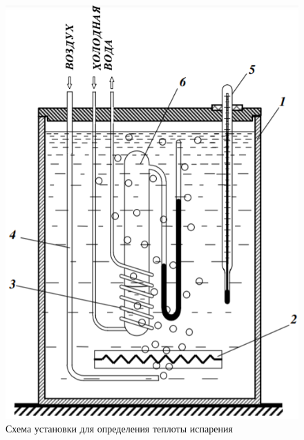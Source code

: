 \documentclass[a4paper,12pt]{article} %
\begin{document}
	\begin{figure}[h!]
		\centering
		\includegraphics[scale = 0.7]{Pictures/Установка.png}
		\caption{Схема установки для определения теплоты испарения}
	\end{figure}

	\newpage
	
\end{document}
